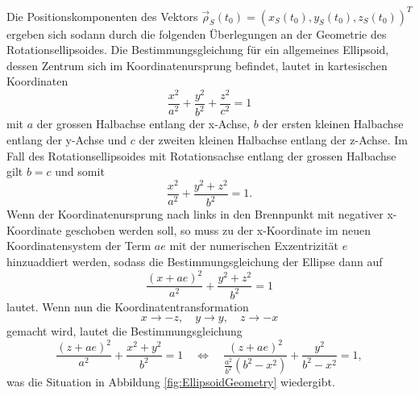 \documentclass[a4paper,12pt]{article}
\numberwithin{equation}{section}
\begin{document}
Die Positionskomponenten des Vektors $\vec{\rho}_S(t_0) = (x_S(t_0),y_S(t_0),z_S(t_0))^T$ ergeben sich sodann durch die folgenden Überlegungen an der Geometrie des Rotationsellipsoides. Die Bestimmungsgleichung für ein allgemeines Ellipsoid, dessen Zentrum sich im Koordinatenursprung befindet, lautet in kartesischen Koordinaten \begin{equation}
\frac{x^2}{a^2} + \frac{y^2}{b^2} + \frac{z^2}{c^2} = 1
\end{equation} mit $a$ der grossen Halbachse entlang der x-Achse, $b$ der ersten kleinen Halbachse entlang der y-Achse und $c$ der zweiten kleinen Halbachse entlang der z-Achse. Im Fall des Rotationsellipsoides mit Rotationsachse entlang der grossen Halbachse gilt $b = c$ und somit \begin{equation}
\frac{x^2}{a^2} + \frac{y^2 + z^2}{b^2} = 1.
\end{equation} Wenn der Koordinatenursprung nach links in den Brennpunkt mit negativer x-Koordinate geschoben werden soll, so muss zu der x-Koordinate im neuen Koordinatensystem der Term $ae$ mit der numerischen Exzentrizität $e$ hinzuaddiert werden, sodass die Bestimmungsgleichung der Ellipse dann auf \begin{equation}
\frac{(x+ae)^2}{a^2} + \frac{y^2+z^2}{b^2} = 1
\end{equation} lautet. Wenn nun die Koordinatentransformation \begin{equation}x \rightarrow -z, \quad y \rightarrow y, \quad z \rightarrow -x\end{equation} gemacht wird, lautet die Bestimmungsgleichung \begin{equation}\label{eq:RelevantEllipsePosBest}
\frac{(z+ae)^2}{a^2} + \frac{x^2+y^2}{b^2} = 1 \quad \Leftrightarrow \quad \frac{(z+ae)^2}{\frac{a^2}{b^2}(b^2-x^2)}+\frac{y^2}{b^2-x^2} = 1,
\end{equation} was die Situation in Abbildung \ref{fig:EllipsoidGeometry} wiedergibt.
\end{document}
